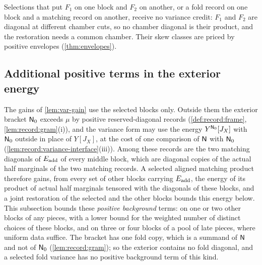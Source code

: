 Selections that put $F_1$ on one block and $F_2$ on another, or a fold record
on one block and a matching record on another, receive no variance credit:
$F_1$ and $F_2$ are diagonal at different chamber cuts, so no chamber diagonal
is their product, and the restoration needs a common chamber. Their skew
classes are priced by positive envelopes (\cref{thm:envelopes}).

\subsection{Additional positive terms in the exterior energy}
\label{subsec:variance:backgrounds}

The gains of \cref{lem:var-gain} use the selected blocks only. Outside them the
exterior bracket $\mathsf N_0$ exceeds $\mu$ by positive reserved-diagonal records
(\cref{def:record:frame}, \cref{lem:record:gram}(i)), and the variance form may
use the energy $Y^{\mathsf N_0}[J_X]$ with $\mathsf N_0$ outside in place of $Y[J_X]$, at the
cost of one comparison of $\mathsf N$ with $\mathsf N_0$
(\cref{lem:record:variance-interface}(iii)). Among these records are the two
matching diagonals of $E_{\rm add}$ of every middle block, which are diagonal
copies of the actual half marginals of the two matching records. A selected
aligned matching product therefore gains, from every set of other blocks
carrying $E_{\rm add}$, the energy of its product of actual half marginals
tensored with the diagonals of these blocks, and a joint restoration of the
selected and the other blocks bounds this energy below. This subsection
bounds these \emph{positive background} terms: on one or two other blocks of any
pieces, with a lower bound for the weighted number of distinct choices of these
blocks, and on three or four blocks of a pool of late pieces, where uniform
data suffice. The bracket has one fold copy, which is a summand of $\mathsf N$ and
not of $\mathsf N_0$ (\cref{lem:record:gram}); so the exterior contains no fold
diagonal, and a selected fold variance has no positive background term of this
kind.

